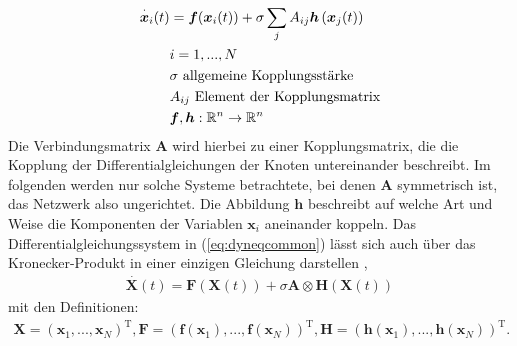 \begin{align}\label{eq:dyneqcommon}
\overset{\cdot}{\boldsymbol{x}}_i(t)&=\boldsymbol{f}(\boldsymbol{x}_i(t))+\sigma\sum_j A_{ij}\boldsymbol{h}\left(\boldsymbol{x}_j(t)\right)
\\\notag & i=1,...,N
\\\notag & \sigma \text{ allgemeine Kopplungsstärke}
\\\notag & A_{ij}\text{ Element der Kopplungsmatrix}
\\\notag & \boldsymbol{f},\boldsymbol{h}:\mathbb{R}^n\rightarrow\mathbb{R}^n
\end{align}
Die Verbindungsmatrix $\boldsymbol{A}$ wird hierbei zu einer Kopplungsmatrix, die die Kopplung der Differentialgleichungen der Knoten untereinander beschreibt. Im folgenden werden nur solche Systeme betrachtete, bei denen $\boldsymbol{A}$ symmetrisch ist, das Netzwerk also ungerichtet. Die Abbildung $\boldsymbol{h}$ beschreibt auf welche Art und Weise die Komponenten der Variablen $\boldsymbol{x}_i$ aneinander koppeln. Das Differentialgleichungssystem in (\ref*{eq:dyneqcommon}) lässt sich auch über das Kronecker-Produkt in einer einzigen Gleichung darstellen \citep{pecora1998},
\begin{align}
\overset{\cdot}{\boldsymbol{X}}(t)=\boldsymbol{F}(\boldsymbol{X}(t))+\sigma\boldsymbol{A}\otimes\boldsymbol{H}(\boldsymbol{X}(t))
\end{align}
mit den Definitionen:
\begin{align*}
\boldsymbol{X}=\left(\boldsymbol{x}_1,...,\boldsymbol{x}_N\right)^{\text{T}},
\boldsymbol{F}=\left(\boldsymbol{f}(\boldsymbol{x}_1),...,\boldsymbol{f}(\boldsymbol{x}_N)\right)^{\text{T}},
\boldsymbol{H}=\left(\boldsymbol{h}(\boldsymbol{x}_1),...,\boldsymbol{h}(\boldsymbol{x}_N)\right)^{\text{T}}.
\end{align*}

